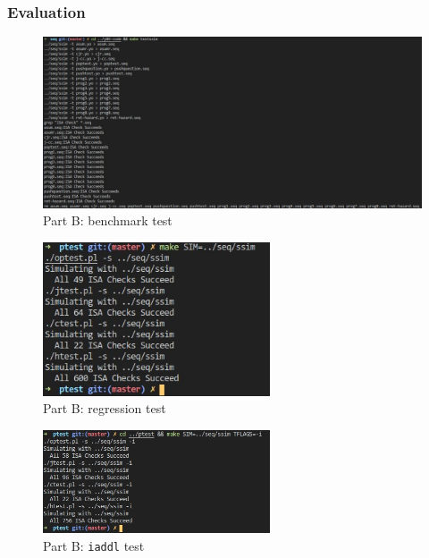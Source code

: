 \documentclass[12pt,a4paper]{article}
\begin{document}
\subsubsection{Evaluation}
\begin{figure}[H] %
        \centering %
        \includegraphics[width=1.0\textwidth]{partB-benchmark.jpg} %
        \caption{Part B: benchmark test} %
        \label{Fig.partB-benchmark} %
\end{figure}
\begin{figure}[H] %
        \centering %
        \includegraphics[width=0.6\textwidth]{partB-regression-test.jpg} %
        \caption{Part B: regression test} %
        \label{Fig.partB-regression} %
\end{figure}
\begin{figure}[H] %
        \centering %
        \includegraphics[width=0.6\textwidth]{partB-test-iaddl.jpg} %
        \caption{Part B: \texttt{iaddl} test} %
        \label{Fig.partB-iaddl} %
\end{figure}
\pagebreak
\end{document}
